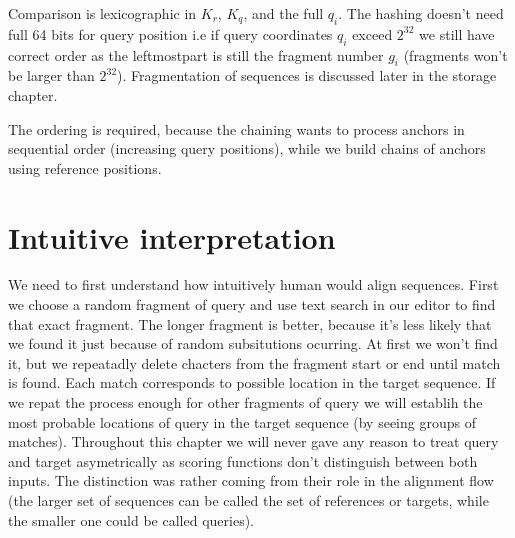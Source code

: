 Comparison is lexicographic in \(K_r\), \(K_q\), and the full \(q_i\). The hashing doesn't need full 64 bits for query position i.e if query coordinates $q_i$ exceed \(2^{32}\) we still have correct order as the leftmostpart is still the fragment number $g_i$ (fragments won't be larger than $2^{32}$). Fragmentation of sequences is discussed later in the storage chapter.

The ordering is required, because the chaining wants to process anchors in sequential order (increasing query positions), while we build chains of anchors using reference positions.

\section{Intuitive interpretation}
\label{sec:chaining-interpretation}

We need to first understand how intuitively human would align sequences. First we choose a random fragment of query and use text search in our editor to find that exact fragment. The longer fragment is better, because it's less likely that we found it just because of random subsitutions ocurring.
At first we won't find it, but we repeatadly delete chacters from the fragment start or end until match is found. Each match corresponds to possible location in the target sequence.
If we repat the process enough for other fragments of query we will establih the most probable locations of query in the target sequence (by seeing groups of matches). Throughout this chapter we will never gave any reason to treat query
and target asymetrically as  scoring functions don't distinguish between both inputs. The distinction was rather coming from their role in the alignment flow
(the larger set of sequences can be called the set of references or targets, while the smaller one could be called queries).


